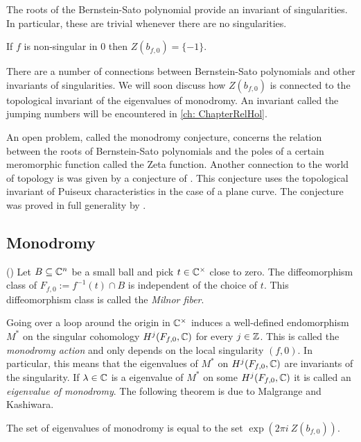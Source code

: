 The roots of the Bernstein-Sato polynomial provide an invariant of singularities.
In particular, these are trivial whenever there are no singularities.
\begin{proposition}{\cite[Section 4.2]{igusa2007introduction}}
  If $f$ is non-singular in $0$ then $Z(b_{f,0}) = \{-1\}$.
\end{proposition}
\begin{remark}
  There are a number of connections between Bernstein-Sato polynomials and other invariants of singularities.
  We will soon discuss how $Z(b_{f,0})$ is connected to the topological invariant of the eigenvalues of monodromy.
  An invariant called the jumping numbers will be encountered in \cref{ch: ChapterRelHol}.

  An open problem, called the monodromy conjecture, concerns the relation between the roots of Bernstein-Sato polynomials and the poles of a certain meromorphic function called the Zeta function.
  Another connection to the world of topology is was given by a conjecture of \cite{yano1982exponents}.
  This conjecture uses the topological invariant of Puiseux characteristics in the case of a plane curve.
  The conjecture was proved in full generality by \cite{blanco2019yano}.
\end{remark}

\subsection{Monodromy}
\begin{theorem}{(\cite{milnor1968singular})}
  Let $B\subseteq \mathbb{C}^n$ be a small ball and pick $t\in \mathbb{C}^\times$ close to zero.
  The diffeomorphism class of $F_{f,0} := f^{-1}(t)\cap B $  is independent of the choice of $t$.
  This diffeomorphism class is called the {\it Milnor fiber}.
\end{theorem}
Going over a loop around the origin in $\mathbb{C}^\times$ induces a well-defined endomorphism $M^*$ on the singular cohomology $H^j(F_{f,0},\mathbb{C})$ for every $j\in \mathbb{Z}$.
This is called the {\it monodromy action} and only depends on the local singularity $(f,0)$.
In particular, this means that the eigenvalues of $M^*$ on $H^j(F_{f,0},\mathbb{C})$ are invariants of the singularity.
If $\lambda \in \mathbb{C}$ is a eigenvalue of $M^*$ on some $H^j(F_{f,0},\mathbb{C})$ it is called an {\it eigenvalue of monodromy}.
The following theorem is due to Malgrange and Kashiwara.
\begin{theorem}\label{thm: EigMonodromy}
The set of eigenvalues of monodromy is equal to the set $\exp(2\pi i\ Z(b_{f,0}))$.
\end{theorem}

